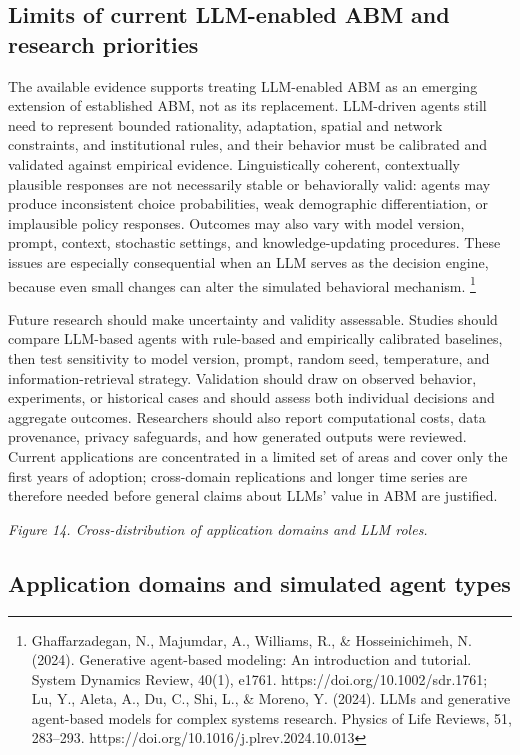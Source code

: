 \subsection{Limits of current LLM-enabled ABM and research priorities}

The available evidence supports treating LLM-enabled ABM as an emerging extension of established ABM, not as its replacement. LLM-driven agents still need to represent bounded rationality, adaptation, spatial and network constraints, and institutional rules, and their behavior must be calibrated and validated against empirical evidence. Linguistically coherent, contextually plausible responses are not necessarily stable or behaviorally valid: agents may produce inconsistent choice probabilities, weak demographic differentiation, or implausible policy responses. Outcomes may also vary with model version, prompt, context, stochastic settings, and knowledge-updating procedures. These issues are especially consequential when an LLM serves as the decision engine, because even small changes can alter the simulated behavioral mechanism. \footnote{Ghaffarzadegan, N., Majumdar, A., Williams, R., \& Hosseinichimeh, N. (2024). Generative agent-based modeling: An introduction and tutorial. System Dynamics Review, 40(1), e1761. https://doi.org/10.1002/sdr.1761; Lu, Y., Aleta, A., Du, C., Shi, L., \& Moreno, Y. (2024). LLMs and generative agent-based models for complex systems research. Physics of Life Reviews, 51, 283–293. https://doi.org/10.1016/j.plrev.2024.10.013}

Future research should make uncertainty and validity assessable. Studies should compare LLM-based agents with rule-based and empirically calibrated baselines, then test sensitivity to model version, prompt, random seed, temperature, and information-retrieval strategy. Validation should draw on observed behavior, experiments, or historical cases and should assess both individual decisions and aggregate outcomes. Researchers should also report computational costs, data provenance, privacy safeguards, and how generated outputs were reviewed. Current applications are concentrated in a limited set of areas and cover only the first years of adoption; cross-domain replications and longer time series are therefore needed before general claims about LLMs’ value in ABM are justified.

\emph{Figure 14. Cross-distribution of application domains and LLM roles.}

\subsection{Application domains and simulated agent types}


